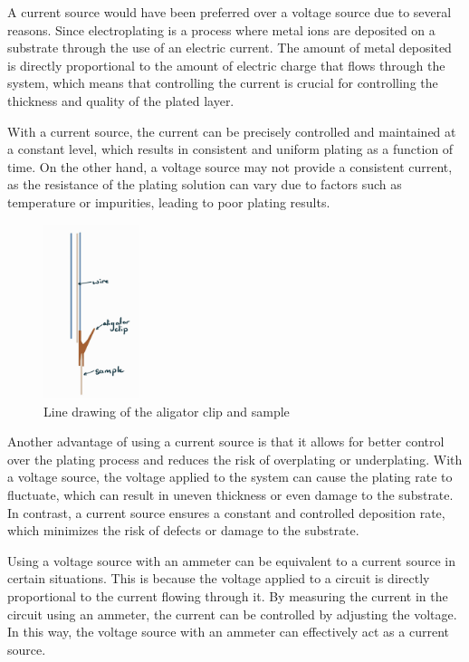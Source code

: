 A current source would have been preferred over a voltage source due to several reasons. Since electroplating is a process where metal ions are deposited on a substrate through the use of an electric current. The amount of metal deposited is directly proportional to the amount of electric charge that flows through the system, which means that controlling the current is crucial for controlling the thickness and quality of the plated layer.

With a current source, the current can be precisely controlled and maintained at a constant level, which results in consistent and uniform plating as a function of time. On the other hand, a voltage source may not provide a consistent current, as the resistance of the plating solution can vary due to factors such as temperature or impurities, leading to poor plating results.


\begin{figure}
    \centering
    \includegraphics[width=0.25\textwidth]{Main/Ch1/Current Sample holder.png}
    \caption{Line drawing of the aligator clip and sample }
\end{figure}

Another advantage of using a current source is that it allows for better control over the plating process and reduces the risk of overplating or underplating. With a voltage source, the voltage applied to the system can cause the plating rate to fluctuate, which can result in uneven thickness or even damage to the substrate. In contrast, a current source ensures a constant and controlled deposition rate, which minimizes the risk of defects or damage to the substrate.

Using a voltage source with an ammeter can be equivalent to a current source in certain situations. This is because the voltage applied to a circuit is directly proportional to the current flowing through it. By measuring the current in the circuit using an ammeter, the current can be controlled by adjusting the voltage. In this way, the voltage source with an ammeter can effectively act as a current source.


